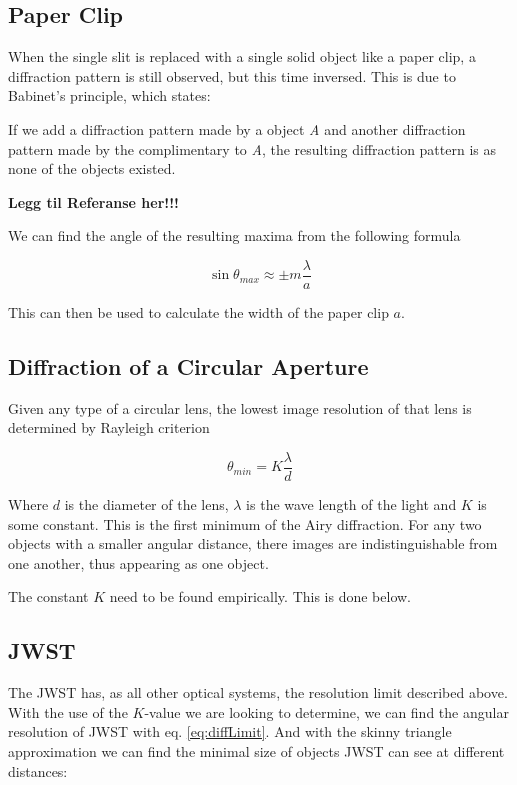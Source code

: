 \documentclass{emulateapj}
\begin{document}
\subsection{Paper Clip}
When the single slit is replaced with a single solid object like a paper clip, a diffraction pattern is still observed, but this time inversed. This is due to Babinet's principle, which states: 

If we add a diffraction pattern made by a object \textit{A} and another diffraction pattern made by the complimentary to \textit{A}, the resulting diffraction pattern is as none of the objects existed.

\textbf{Legg til Referanse her!!!}

We can find the angle of the resulting maxima from the following formula

\begin{equation}
\sin \theta_{max} \approx \pm m\frac{\lambda}{a}
\end{equation}\label{eq:paperClipMax}

This can then be used to calculate the width of the paper clip $a$.

\subsection{Diffraction of a Circular Aperture}
Given any type of a circular lens, the lowest image resolution of that lens is determined by Rayleigh criterion

\begin{equation}
\theta_{min} = K\frac{\lambda}{d}
\end{equation}\label{eq:diffLimit}

Where $d$ is the diameter of the lens, $\lambda$ is the wave length of the light and $K$ is some constant. This is the first minimum of the Airy diffraction. For any two objects with a smaller angular distance, there images are indistinguishable from one another, thus appearing as one object.

The constant $K$ need to be found empirically. This is done below.

\subsection{JWST}
The JWST has, as all other optical systems, the resolution limit described above. With the use of the $K$-value we are looking to determine, we can find the angular resolution of JWST with eq. \eqref{eq:diffLimit}. And with the skinny triangle approximation we can find the minimal size of objects JWST can see at different distances:
\end{document}
